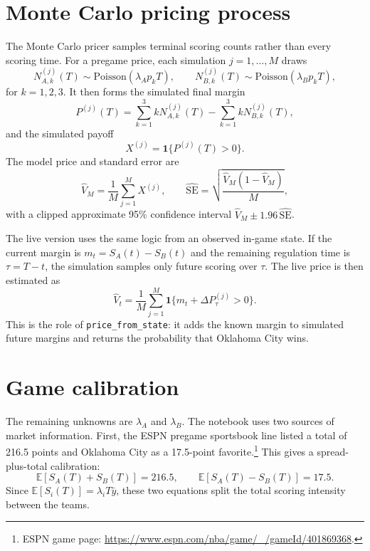 \documentclass[10pt]{article}
\begin{document}
\section{Monte Carlo pricing process}

The Monte Carlo pricer samples terminal scoring counts rather than every
scoring time. For a pregame price, each simulation \(j=1,\dots,M\) draws
\[
    N_{A,k}^{(j)}(T) \sim \mathrm{Poisson}(\lambda_A p_k T),
    \qquad
    N_{B,k}^{(j)}(T) \sim \mathrm{Poisson}(\lambda_B p_k T),
\]
for \(k=1,2,3\). It then forms the simulated final margin
\begin{equation}
    P^{(j)}(T)
    =
    \sum_{k=1}^3 kN_{A,k}^{(j)}(T)
    -
    \sum_{k=1}^3 kN_{B,k}^{(j)}(T),
\end{equation}
and the simulated payoff
\begin{equation}
    X^{(j)} = \mathbf{1}\{P^{(j)}(T) > 0\}.
\end{equation}
The model price and standard error are
\begin{equation}
    \widehat V_M = \frac{1}{M}\sum_{j=1}^M X^{(j)},
    \qquad
    \widehat{\mathrm{SE}} =
    \sqrt{\frac{\widehat V_M(1-\widehat V_M)}{M}},
\end{equation}
with a clipped approximate 95\% confidence interval
\(\widehat V_M \pm 1.96\,\widehat{\mathrm{SE}}\).

The live version uses the same logic from an observed in-game state. If the
current margin is \(m_t=S_A(t)-S_B(t)\) and the remaining regulation time is
\(\tau=T-t\), the simulation samples only future scoring over \(\tau\). The
live price is then estimated as
\begin{equation}
    \widehat V_t
    =
    \frac{1}{M}\sum_{j=1}^M
    \mathbf{1}\{m_t + \Delta P_\tau^{(j)} > 0\}.
\end{equation}
This is the role of \texttt{price\_from\_state}: it adds the known margin to
simulated future margins and returns the probability that Oklahoma City wins.

\section{Game calibration}

The remaining unknowns are \(\lambda_A\) and \(\lambda_B\). The notebook uses
two sources of market information. First, the ESPN pregame sportsbook line
listed a total of 216.5 points and Oklahoma City as a 17.5-point
favorite.\footnote{ESPN game page:
\url{https://www.espn.com/nba/game/_/gameId/401869368}.} This gives a
spread-plus-total calibration:
\[
    \mathbb{E}[S_A(T)+S_B(T)] = 216.5,
    \qquad
    \mathbb{E}[S_A(T)-S_B(T)] = 17.5.
\]
Since \(\mathbb{E}[S_i(T)] = \lambda_i T\bar y\), these two equations split
the total scoring intensity between the teams.
\end{document}
